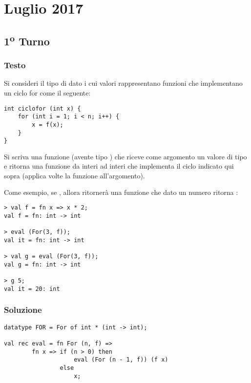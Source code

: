 \section{Luglio 2017}

\subsection{1\textsuperscript{o} Turno}

\subsubsection{Testo}

Si consideri il tipo di dato  i cui valori  rappresentano funzioni che implementano un ciclo for come il seguente:

\begin{lstlisting}
int ciclofor (int x) {
	for (int i = 1; i < n; i++) {
		x = f(x);
	}
}
\end{lstlisting}

Si scriva una funzione  (avente tipo ) che riceve come argomento un valore di tipo  e ritorna una funzione da interi ad interi che implementa il ciclo indicato qui sopra (applica  volte la funzione  all'argomento).

\medskip
Come esempio, se , allora  ritornerà una funzione che dato un numero  ritorna :

\begin{lstlisting}[style = SML]
> val f = fn x => x * 2;
val f = fn: int -> int

> eval (For(3, f));
val it = fn: int -> int

> val g = eval (For(3, f));
val g = fn: int -> int

> g 5;
val it = 20: int
\end{lstlisting}

\subsubsection{Soluzione}

\begin{lstlisting}[style = SML, caption = {definizione della funzione \sml{eval}}]
datatype FOR = For of int * (int -> int);

val rec eval = fn For (n, f) =>
		fn x => if (n > 0) then
					eval (For (n - 1, f)) (f x)
				else
					x;
\end{lstlisting}


